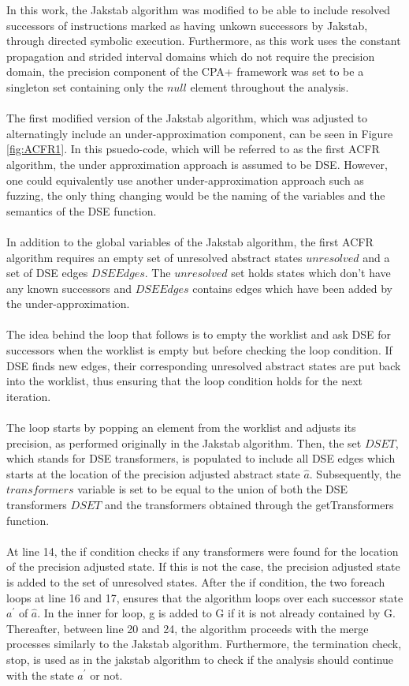\documentclass{kththesis}
\begin{document}
\clearpage
\noindent
In this work, the Jakstab algorithm was modified to be able to include resolved successors of instructions marked as having unkown successors by Jakstab, through directed symbolic execution. Furthermore, as this work uses the constant propagation and strided interval domains which do not require the precision domain, the precision component of the CPA+ framework was set to be a singleton set containing only the $null$ element throughout the analysis.
\\ \\
The first modified version of the Jakstab algorithm, which was adjusted to alternatingly include an under-approximation component, can be seen in Figure \ref{fig:ACFR1}. In this psuedo-code, which will be referred to as the first ACFR algorithm, the under approximation approach is assumed to be DSE. However, one could equivalently use another under-approximation approach such as fuzzing, the only thing changing would be the naming of the variables and the semantics of the DSE function.
\\ \\
In addition to the global variables of the Jakstab algorithm, the first ACFR algorithm requires an empty set of unresolved abstract states $unresolved$ and a set of DSE edges $DSEEdges$. The $unresolved$ set holds states which don't have any known successors and $DSEEdges$ contains edges which have been added by the under-approximation. 
\\ \\
The idea behind the loop that follows is to empty the worklist and ask DSE for successors when the worklist is empty but before checking the loop condition. If DSE finds new edges, their corresponding unresolved abstract states are put back into the worklist, thus ensuring that the loop condition holds for the next iteration.
\\ \\
The loop starts by popping an element from the worklist and adjusts its precision, as performed originally in the Jakstab algorithm. Then, the set $DSET$, which stands for DSE transformers, is populated to include all DSE edges which starts at the location of the precision adjusted abstract state $\hat{a}$. Subsequently, the $transformers$ variable is set to be equal to the union of both the DSE transformers $DSET$ and the transformers obtained through the getTransformers function.
\\ \\
At line 14, the if condition checks if any transformers were found for the location of the precision adjusted state. If this is not the case, the precision adjusted state is added to the set of unresolved states. After the if condition, the two foreach loops at line 16 and 17, ensures that the algorithm loops over each successor state $a^{\prime}$ of $\hat{a}$. In the inner for loop, g is added to G if it is not already contained by G. Thereafter, between line 20 and 24, the algorithm proceeds with the merge processes similarly to the Jakstab algorithm. Furthermore, the termination check, stop, is used as in the jakstab algorithm to check if the analysis should continue with the state $a^{\prime}$ or not.
\end{document}

